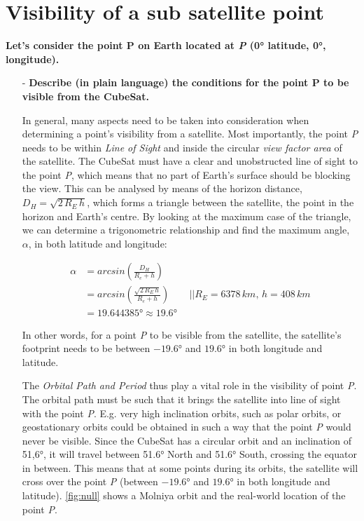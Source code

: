 \section{Visibility of a sub satellite point} 

 
\textbf{Let’s consider the point P on Earth located at \textit{P} (0° latitude, 0°, longitude). }
\begin{itemize}
    \item[-] \textbf{Describe (in plain language) the conditions for the point P to be visible from the CubeSat.}

    In general, many aspects need to be taken into consideration when determining a point's visibility from a satellite. 
    Most importantly, the point \textit{P} needs to be within \textit{Line of Sight} and inside the circular \textit{view factor area} of the satellite. 
    The CubeSat must have a clear and unobstructed line of sight to the point \textit{P}, which means that no part of Earth's surface should be blocking the view. 
    This can be analysed by means of the horizon distance, $D_H = \sqrt{2\, R_E\,h}$, which forms a triangle between the satellite, the point in the horizon and Earth's centre. 
    By looking at the maximum case of the triangle, we can determine a trigonometric relationship and find the maximum angle, $\alpha$, in both latitude and longitude:
    
    \begin{equation}
        \label{eq:max_angle}
        \begin{split}
            \alpha &= arcsin \left(\frac{D_H}{R_e + h}\right) \\
            &= arcsin \left(\frac{\sqrt{2\, R_E\,h}}{R_e + h}\right) \qquad || R_E = 6378\,km, \, h = 408\,km \\
            &= 19.644385\text{°} \approx 19.6\text{°}
        \end{split}
    \end{equation}

    In other words, for a point \textit{P} to be visible from the satellite, the satellite's footprint needs to be between $-19.6$° and $19.6$° in both longitude and latitude.


    The \textit{Orbital Path and Period} thus play a vital role in the visibility of point \textit{P}. 
    The orbital path must be such that it brings the satellite into line of sight with the point \textit{P}. 
    E.g. very high inclination orbits, such as polar orbits, or geostationary orbits could be obtained in such a way that the point \textit{P} would never be visible.
    Since the CubeSat has a circular orbit and an inclination of 51,6°, it will travel between 51.6° North and 51.6° South, crossing the equator in between. 
    This means that at some points during its orbits, the satellite will cross over the point \textit{P} (between $-19.6$° and $19.6$° in both longitude and latitude).
    \autoref{fig:null} shows a Molniya orbit and the real-world location of the point \textit{P}.
    

\end{itemize}
